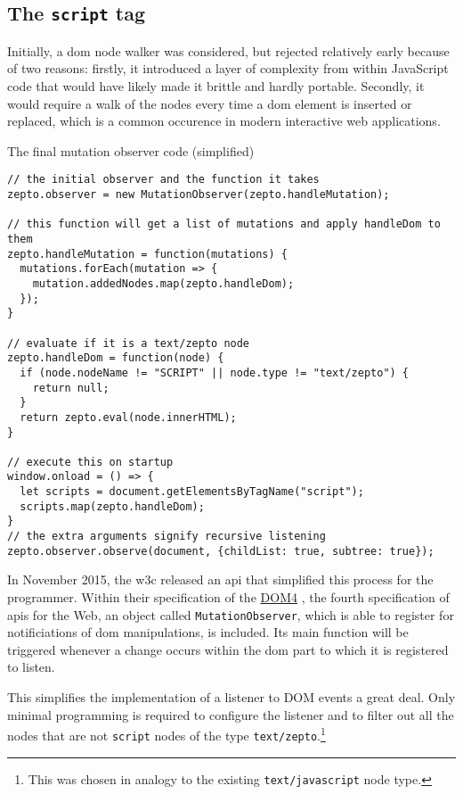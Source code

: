 \documentclass[oneside,11pt,xetex]{scrbook}
\begin{document}
\subsection{The \texttt{script} tag}
\label{sec:MutObs}

Initially, a \gls{dom} node walker was considered, but rejected relatively early because of two reasons:
firstly, it introduced a layer of complexity from within JavaScript code that would have likely made
it brittle and hardly portable. Secondly, it would require a walk of the nodes every time a \gls{dom}
element is inserted or replaced, which is a common occurence in modern interactive web applications.

\begin{listing}[H]
\caption{The final mutation observer code (simplified)}
\begin{verbatim}
// the initial observer and the function it takes
zepto.observer = new MutationObserver(zepto.handleMutation);

// this function will get a list of mutations and apply handleDom to them
zepto.handleMutation = function(mutations) {
  mutations.forEach(mutation => {
    mutation.addedNodes.map(zepto.handleDom);
  });
}

// evaluate if it is a text/zepto node
zepto.handleDom = function(node) {
  if (node.nodeName != "SCRIPT" || node.type != "text/zepto") {
    return null;
  }
  return zepto.eval(node.innerHTML);
}

// execute this on startup
window.onload = () => {
  let scripts = document.getElementsByTagName("script");
  scripts.map(zepto.handleDom);
}
// the extra arguments signify recursive listening
zepto.observer.observe(document, {childList: true, subtree: true});
\end{verbatim}
\label{fig:mutobs}
\end{listing}

In November 2015, the \gls{w3c} released an \gls{api} that simplified this process
for the programmer. Within their specification of the
\href{https://www.w3.org/TR/dom/#mutationobserver}{DOM4} \parencite{DOM4} , the fourth
specification of \gls{api}s for the Web, an object called \texttt{MutationObserver}, which is
able to register for notificiations of \gls{dom} manipulations, is included. Its main function
will be triggered whenever a change occurs within the \gls{dom} part to which it is registered
to listen.

This simplifies the implementation of a listener to DOM events a great deal. Only minimal programming
is required to configure the listener and to filter out all the nodes that are not \texttt{script} nodes
of the type \texttt{text/zepto}.\footnote{This was chosen in analogy to the existing \texttt{text/javascript}
node type.}
\end{document}
